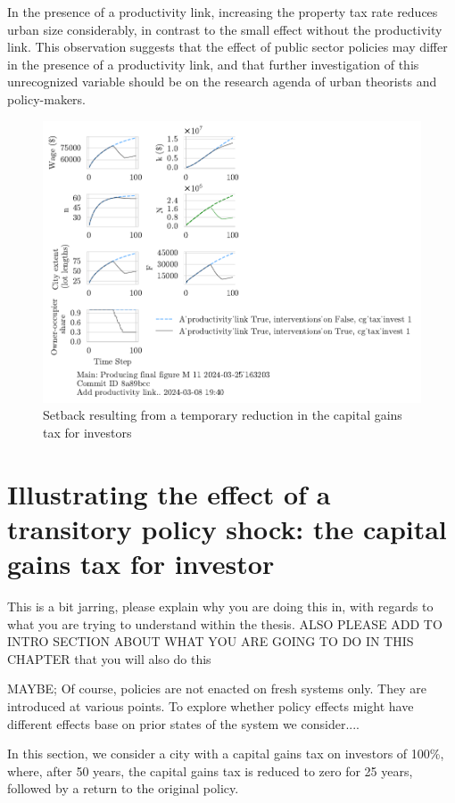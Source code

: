 In the presence of a productivity link, increasing the property tax rate reduces urban size considerably, in contrast to the small effect without the productivity link. This observation suggests that the effect of public sector policies may differ in the presence of a productivity link, and that further investigation of this unrecognized variable should be on the research agenda of urban theorists and policy-makers.


\begin{figure}[h!tb] 
    \centering
    \includegraphics[scale=1., trim={0 1.4cm 7cm 0},clip]{fig/interventions_on-cg_tax_invest-163203.pdf}  %
    \caption{Setback resulting from a temporary reduction in the capital gains tax for investors}
    \label{fig:cgtax_setback}
\end{figure}




\section{Illustrating the effect of a transitory policy shock: the capital gains tax for investor}

{\color{red} This is a bit jarring, please explain why you are doing this in, with regards to what you are trying to understand within the thesis. ALSO PLEASE ADD TO INTRO SECTION ABOUT WHAT YOU ARE GOING TO DO IN THIS CHAPTER that you will also do this

MAYBE; Of course, policies are not enacted on fresh systems only. They are introduced at various points. To explore whether policy effects might have different effects base on prior states of the system we consider....}
In this section, we consider a city with a capital gains tax on investors of 100\%, where, after 50 years, the capital gains tax is reduced to zero for 25 years, followed by a return to the original policy.


